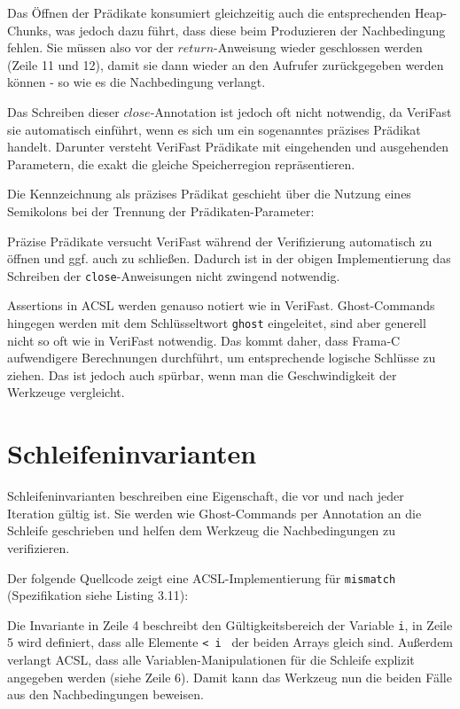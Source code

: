 Das Öffnen der Prädikate konsumiert gleichzeitig auch die entsprechenden Heap-Chunks, was jedoch dazu führt,
dass diese beim Produzieren der Nachbedingung fehlen. Sie müssen also vor der \(return\)-Anweisung
wieder geschlossen werden (Zeile 11 und 12), damit sie dann wieder an den Aufrufer zurückgegeben werden können 
- so wie es die Nachbedingung verlangt.

Das Schreiben dieser \(close\)-Annotation ist jedoch oft nicht notwendig, da VeriFast sie automatisch
einführt, wenn es sich um ein sogenanntes präzises Prädikat handelt. Darunter versteht VeriFast Prädikate mit 
eingehenden und ausgehenden Parametern, die exakt die gleiche Speicherregion repräsentieren. 

Die Kennzeichnung als präzises Prädikat geschieht über die Nutzung eines Semikolons bei der Trennung
der Prädikaten-Parameter:



Präzise Prädikate versucht VeriFast während der Verifizierung automatisch zu öffnen und ggf. auch zu
schließen. Dadurch ist in der obigen Implementierung das Schreiben der \texttt{close}-Anweisungen
nicht zwingend notwendig.

Assertions in ACSL werden genauso notiert wie in VeriFast. Ghost-Commands hingegen werden
mit dem Schlüsseltwort \lstinline{ghost} eingeleitet, sind aber generell nicht so oft wie in
VeriFast notwendig. Das kommt daher, dass Frama-C aufwendigere Berechnungen durchführt, um
entsprechende logische Schlüsse zu ziehen. Das ist jedoch auch spürbar, wenn man die
Geschwindigkeit der Werkzeuge vergleicht.


\section{Schleifeninvarianten}

Schleifeninvarianten beschreiben eine Eigenschaft, die vor und nach jeder Iteration gültig ist. Sie
werden wie Ghost-Commands per Annotation an die Schleife geschrieben und helfen dem Werkzeug die
Nachbedingungen zu verifizieren.

Der folgende Quellcode zeigt eine ACSL-Implementierung für \lstinline{mismatch}
(Spezifikation siehe Listing 3.11):


Die Invariante in Zeile 4 beschreibt den Gültigkeitsbereich der Variable \lstinline{i}, in Zeile 5 wird definiert, 
dass alle Elemente \lstinline{< i } der beiden Arrays gleich sind. Außerdem verlangt ACSL, dass alle
Variablen-Manipulationen für die Schleife explizit angegeben werden (siehe Zeile 6). Damit kann das Werkzeug
nun die beiden Fälle aus den Nachbedingungen beweisen.

